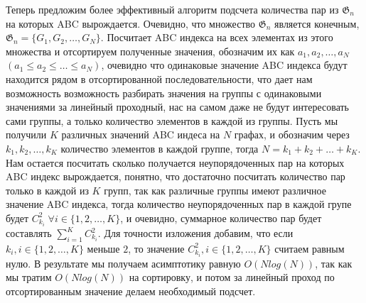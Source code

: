 \documentclass{article}
\begin{document}
Теперь предложим более эффективный алгоритм подсчета количества пар из $\mathfrak{G}_n$ на которых ABC вырождается. Очевидно, что множество $\mathfrak{G}_n$ является конечным, $\mathfrak{G}_n = \{ G_1, G_2, \dots, G_N \}$. Посчитает ABC индекса на всех элементах из этого множества и отсортируем полученные значения, обозначим их как $a_1, a_2, \dots, a_N$ $(a_1 \leq a_2 \leq \dots \leq a_N)$, очевидно что одинаковые значение ABC индекса будут находится рядом в отсортированной последовательности, что дает нам возможность возможность разбирать значения на группы с одинаковыми значениями за линейный проходный, нас на самом даже не будут интересовать сами группы, а только количество элементов в каждой из группы. Пусть мы получили $K$ различных значений ABC индеса на $N$ графах, и обозначим через $k_1, k_2, \dots, k_K$ количество элементов в каждой группе, тогда $N = k_1 + k_2 + \dots + k_K$. Нам остается посчитать сколько получается неупорядоченных пар на которых ABC индекс вырождается, понятно, что достаточно посчитать количество пар только в каждой из $K$ групп, так как различные группы имеют различное значение ABC индекса, тогда количество неупорядоченных пар в каждой групе будет $C_{k_i}^2 \; \forall i \in \{1, 2, \dots, K \}$, и очевидно, суммарное количество пар будет составлять $\sum_{i=1}^{K} C_{k_i}^2$. Для точности изложения добавим, что если $k_i, i \in \{1, 2, \dots, K \}$ меньше $2$, то значение $C_{k_i}^{2}, i \in \{ 1, 2, \dots, K \}$ считаем равным нулю. В результате мы получаем асимптотику равную $O(N log(N))$, так как мы тратим $O(N log(N))$ на сортировку, и потом за линейный проход по отсортированным значение делаем необходимый подсчет.


\newpage
\end{document}
